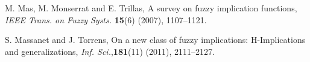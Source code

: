 \documentclass[12pt]{article}
\theoremstyle{plain}
\theoremstyle{remark}
\theoremstyle{definition}
\theoremstyle{proposition}
\begin{document}
\begin{thebibliography}{8}
{%



%

M. Mas, M. Monserrat and E. Trillas, A survey on fuzzy implication functions,
\emph{IEEE Trans. on Fuzzy Systs.} \textbf{15}(6) (2007), 1107--1121.

 S. Massanet and J. Torrens, On a new class of fuzzy implications: H-Implications
		 and generalizations, \emph{Inf. Sci.},\hspace{-0.1cm}\textbf{181}(11) \hspace{-0.05cm}(2011),\hspace{-0.05cm} 2111--2127.



%



}
\end{thebibliography}
\end{document}
